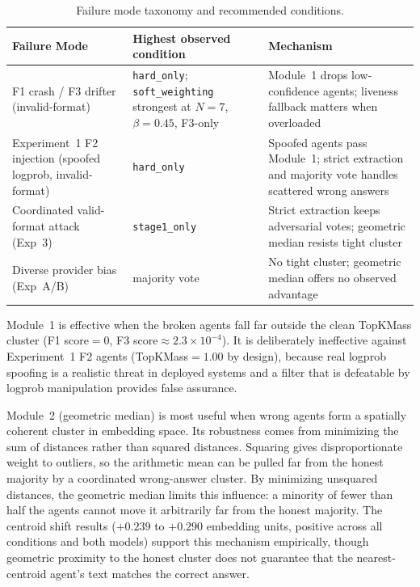 \documentclass[11pt]{article}
\begin{document}
\begin{table}[t]
\centering
\caption{Failure mode taxonomy and recommended conditions.}
\label{tab:failure-modes}
{\footnotesize
\setlength{\tabcolsep}{5pt}
\renewcommand{\arraystretch}{1.08}
\begin{tabularx}{\textwidth}{p{}p{}X}
\toprule
\textbf{Failure Mode}
  & \textbf{Highest observed condition}
  & \textbf{Mechanism} \\
\midrule
F1 crash / F3 drifter (invalid-format)
  & \texttt{hard\_only}; \texttt{soft\_weighting} strongest at $N=7$,
    $\beta=0.45$, F3-only
  & Module~1 drops low-confidence agents; liveness fallback matters
    when overloaded \\[6pt]
Experiment~1 F2 injection (spoofed logprob, invalid-format)
  & \texttt{hard\_only}
  & Spoofed agents pass Module~1; strict extraction and majority vote
    handles scattered wrong answers \\[6pt]
Coordinated valid-format attack (Exp~3)
  & \texttt{stage1\_only}
  & Strict extraction keeps adversarial votes; geometric median resists
    tight cluster \\[6pt]
Diverse provider bias (Exp~A/B)
  & majority vote
  & No tight cluster; geometric median offers no observed advantage \\
\bottomrule
\end{tabularx}
}
\end{table}

Module~1 is effective when the broken agents fall far outside the clean TopKMass
cluster (F1 score$=0$, F3 score${\approx}2.3\times10^{-4}$). It is deliberately
ineffective against Experiment~1 F2 agents (TopKMass$=1.00$ by design), because
real logprob spoofing is a realistic threat in deployed systems and a filter that
is defeatable by logprob manipulation provides false assurance.

Module~2 (geometric median) is most useful when wrong agents form a spatially
coherent cluster in embedding space. Its robustness comes from minimizing the sum
of distances rather than squared distances. Squaring gives disproportionate
weight to outliers, so the arithmetic mean can be pulled far from the honest
majority by a coordinated wrong-answer cluster. By minimizing unsquared
distances, the geometric median limits this influence: a minority of fewer than
half the agents cannot move it arbitrarily far from the honest majority. The
centroid shift results ($+0.239$ to $+0.290$ embedding units, positive across
all conditions and both models) support this mechanism empirically, though
geometric proximity to the honest cluster does not guarantee that the
nearest-centroid agent's text matches the correct answer.
\end{document}
